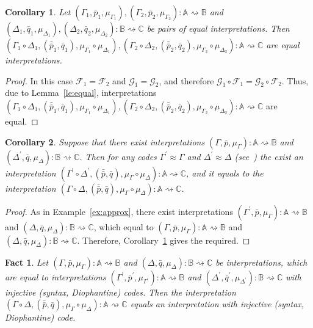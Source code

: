 \documentclass[12pt]{article}
\newtheorem{fact}{Fact}
\newtheorem{corollary}{Corollary}
\theoremstyle{definition}
\def\MA{{\mathbb{A}}}
\def\MB{{\mathbb{B}}}
\def\MC{{\mathbb{C}}}
\def\F{{\mathcal{F}}}
\def\G{{\mathcal{G}}}
\begin{document}
\begin{corollary}\label{cor1:par}
Let $(\Gamma_1,\bar p_1,\mu_{\Gamma_1}),(\Gamma_2,\bar p_2,\mu_{\Gamma_2})\colon \MA\rightsquigarrow\MB$ and $(\Delta_1,\bar q_1,\mu_{\Delta_1}),(\Delta_2,\bar q_2,\mu_{\Delta_2})\colon \MB\rightsquigarrow\MC$ be pairs of equal interpretations. Then $(\Gamma_1\circ\Delta_1,(\bar{\bar p}_1,\bar q_1),\mu_{\Gamma_1}\circ\mu_{\Delta_1}),(\Gamma_2\circ\Delta_2,(\bar{\bar p}_2,\bar q_2),\mu_{\Gamma_2}\circ\mu_{\Delta_2})\colon \MA\rightsquigarrow\MC$ are equal  interpretations.
\end{corollary}

\begin{proof}
In this case $\F_1=\F_2$ and $\G_1=\G_2$, and therefore $\G_1\circ\F_1=\G_2\circ\F_2$. Thus, due to  Lemma~\ref{le:equal}, interpretations $(\Gamma_1\circ\Delta_1,(\bar{\bar p}_1,\bar q_1),\mu_{\Gamma_1}\circ\mu_{\Delta_1}),(\Gamma_2\circ\Delta_2,(\bar{\bar p}_2,\bar q_2),\mu_{\Gamma_2}\circ\mu_{\Delta_2})\colon \MA\rightsquigarrow\MC$ are equal. 
\end{proof}

\begin{corollary}\label{cor2:par}
Suppose that there exist interpretations $(\Gamma,\bar p,\mu_\Gamma)\colon \MA\rightsquigarrow\MB$ and $(\Delta^\prime,\bar q,\mu_\Delta)\colon \MB\rightsquigarrow\MC$. Then for any codes $\Gamma^\prime\approx\Gamma$ and $\Delta^\prime\approx\Delta$ (see~\cite[Definition~3]{Th_int1}) the exist an interpretation $(\Gamma^\prime\circ\Delta^\prime,(\bar{\bar p},\bar q),\mu_\Gamma\circ\mu_\Delta)\colon \MA\rightsquigarrow\MC$, and it equals to the interpretation $(\Gamma\circ\Delta,(\bar{\bar p},\bar q),\mu_\Gamma\circ\mu_\Delta)\colon \MA\rightsquigarrow\MC$.
\end{corollary}

\begin{proof}
As in Example~\ref{ex:approx}, there exist interpretations $(\Gamma^\prime,\bar p,\mu_\Gamma)\colon \MA\rightsquigarrow\MB$ and $(\Delta,\bar q,\mu_\Delta)\colon \MB\rightsquigarrow\MC$, which equal to $(\Gamma,\bar p,\mu_\Gamma)\colon \MA\rightsquigarrow\MB$ and $(\Delta,\bar q,\mu_\Delta)\colon \MB\rightsquigarrow\MC$. Therefore, Corollary~\ref{cor1:par} gives the required. 
\end{proof}

\begin{fact}
Let $(\Gamma,\bar p,\mu_\Gamma)\colon \MA\rightsquigarrow\MB$ and $(\Delta,\bar q,\mu_\Delta)\colon\MB\rightsquigarrow\MC$ be interpretations, which are equal to interpretations $(\Gamma^\prime,\bar p^\prime,\mu_{\Gamma^\prime})\colon \MA\rightsquigarrow\MB$ and $(\Delta^\prime,\bar q^\prime,\mu_{\Delta^\prime})\colon\MB\rightsquigarrow\MC$ with injective (syntax, Diophantine) codes. Then the interpretation $(\Gamma\circ\Delta,(\bar{\bar p},\bar q),\mu_\Gamma\circ\mu_\Delta)\colon \MA\rightsquigarrow\MC$ equals an interpretation with injective (syntax, Diophantine) code.
\end{fact}
\end{document}
